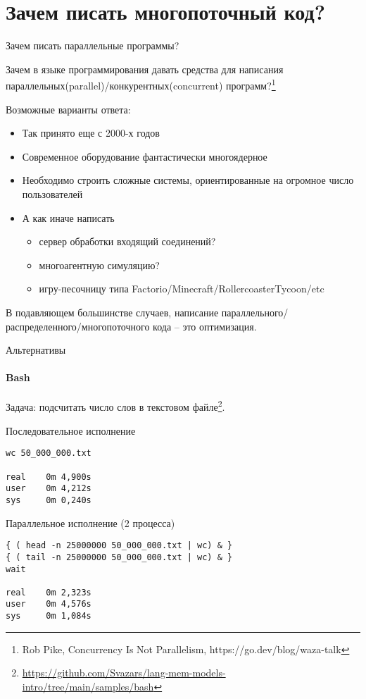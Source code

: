 

\section{Зачем писать многопоточный код?}
\showTOC


\begin{frame}{Зачем писать параллельные программы?}

Зачем в языке программирования давать средства для написания параллельных(parallel)/конкурентных(concurrent) программ?\footnote{Rob Pike, Concurrency Is Not Parallelism, https://go.dev/blog/waza-talk}

\pause

Возможные варианты ответа:
\begin{itemize}
 \item Так принято еще с 2000-х годов
 \item Современное оборудование фантастически многоядерное
 \item Необходимо строить сложные системы, ориентированные на огромное число пользователей
 \item А как иначе написать 
 \begin{itemize}
    \item сервер обработки входящий соединений?
    \item многоагентную симуляцию?
    \item игру-песочницу типа Factorio/Minecraft/RollercoasterTycoon/etc
 \end{itemize}
\end{itemize}

\pause

В подавляющем большинстве случаев, написание параллельного/распределенного/многопоточного кода -- это оптимизация.

\end{frame}


\begin{frame}[fragile]{Альтернативы}
\framesubtitle{Bash}

Задача: подсчитать число слов в текстовом файле\footnote{\tiny\url{https://github.com/Svazars/lang-mem-models-intro/tree/main/samples/bash}}.

\pause
Последовательное исполнение
\begin{lstlisting}
wc 50_000_000.txt

real    0m 4,900s
user    0m 4,212s
sys     0m 0,240s
\end{lstlisting}

\pause 
Параллельное исполнение (2 процесса)
\begin{lstlisting}
{ ( head -n 25000000 50_000_000.txt | wc) & }
{ ( tail -n 25000000 50_000_000.txt | wc) & }
wait

real    0m 2,323s
user    0m 4,576s
sys     0m 1,084s
\end{lstlisting}

\end{frame}

